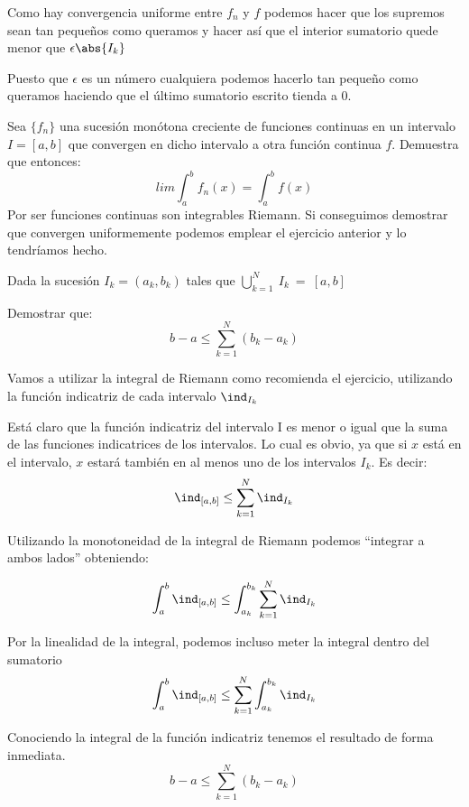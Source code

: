 \begin{problem}[5]
Como hay convergencia uniforme entre $f_n$ y $f$ podemos hacer que los supremos sean tan pequeños como queramos y hacer así que el interior sumatorio quede menor que $\epsilon \abs{I_k}$

Puesto que $\epsilon$ es un número cualquiera podemos hacerlo tan pequeño como queramos haciendo que el último sumatorio escrito tienda a 0.

\end{problem}

\begin{problem}[6]

Sea $\lbrace f_n \rbrace$ una sucesión monótona creciente de funciones continuas en un intervalo $I=[a,b]$ que convergen en dicho intervalo a otra función continua $f$. Demuestra que entonces:
\[ lim \int_{a}^{b} f_n(x) = \int_{a}^{b} f(x) \]
\solution
Por ser funciones continuas son integrables Riemann. Si conseguimos demostrar que convergen uniformemente podemos emplear el ejercicio anterior y lo tendríamos hecho.
\end{problem}

\begin{problem}[7]
Dada la sucesión $I_k = (a_k, b_k)$ tales que $\bigcup_{k=1}^{N}~I_k~=~[a,b]$

Demostrar que:
\[b-a \leq \sum_{k=1}^N (b_k - a_k)\]

\solution
Vamos a utilizar la integral de Riemann como recomienda el ejercicio, utilizando la función indicatriz de cada intervalo $\ind_{I_k}$

Está claro que la función indicatriz del intervalo I es menor o igual que la suma de las funciones indicatrices de los intervalos. Lo cual es obvio, ya que si $x$ está en el intervalo, $x$ estará también en al menos uno de los intervalos $I_k$. Es decir:
\[\ind_{[a,b]} \leq \sum_{k=1}^{N} \ind_{I_k}\]

Utilizando la monotoneidad de la integral de Riemann podemos ``integrar a ambos lados'' obteniendo:

\[\int_{a}^{b} \ind_{[a,b]} \leq \int_{a_k}^{b_k} \sum_{k=1}^{N} \ind_{I_k}\]

Por la linealidad de la integral, podemos incluso meter la integral dentro del sumatorio
\[\int_{a}^{b} \ind_{[a,b]} \leq \sum_{k=1}^{N} \int_{a_k}^{b_k} \ind_{I_k}\]


Conociendo la integral de la función indicatriz tenemos el resultado de forma inmediata.
\[b-a \leq \sum_{k=1}^{N} ( b_k - a_k )\]

\end{problem}

